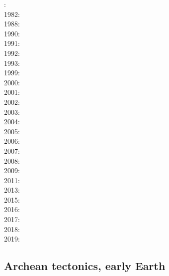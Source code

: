 {\scriptsize
{}: \cite{dixo75}\\
1982: \cite{tapl82}\\
1988: \cite{peta88}\cite{crud88}\\
1990: \cite{mccl90}\\
1991: \cite{daco91}\\
1992: \cite{salt92}\\
1993: \cite{nabr93}\cite{shem93}\\
1999: \cite{dava99}\cite{befo99}\cite{fagd99}\\
2000: \cite{sche00}\cite{sobm00}\\
2001: \cite{haki01}\\
2002: \cite{dagl02}\\
2003: \cite{smbs03}\\
2004: \cite{sche04}\cite{sche04b}\\
2005: \cite{jujb05}\cite{sche05}\cite{sobb05}\\
2006: \cite{scbb06}\cite{tibs06}\\
2007: \cite{socb07}\\
2008: \cite{clbz08}\cite{fufh08}\\
2009: \cite{pina09}\\
2011: \cite{dalt11}\\
2013: \cite{luws13}\\
2015: \cite{casw15}\cite{rods15}\cite{kiff15}\\
2016: \cite{scbb16}\\
2017: \cite{casw17}\\
2018: \cite{pirf18}\\
2019: \cite{mocb19}\cite{sccs19}\cite{muwm19}
}

\subsection{Archean tectonics, early Earth}

\noindent
{\scriptsize
\cite{boas84}
\cite{vlvv94}
\cite{kafo96}
\cite{devv00b}
\cite{vavv04b}
\cite{vavv04}
\cite{vava08}
\cite{maha15}
\cite{onlw16}
\cite{fige16}
\cite{canc19}\cite{gery19}
}

